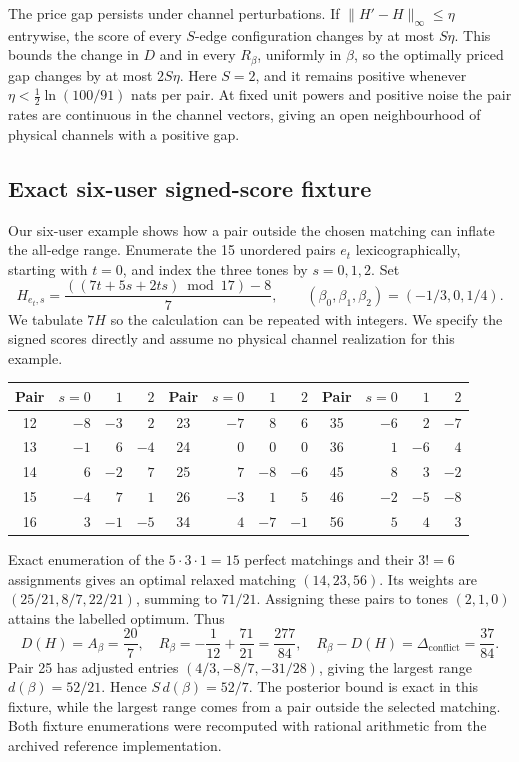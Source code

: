 \documentclass[10pt,letterpaper]{article}
\begin{document}
The price gap persists under channel perturbations. If \(\|H'-H\|_\infty\le\eta\) entrywise, the score of every \(S\)-edge configuration changes by at most \(S\eta\). This bounds the change in \(D\) and in every \(R_\beta\), uniformly in \(\beta\), so the optimally priced gap changes by at most \(2S\eta\). Here \(S=2\), and it remains positive whenever \(\eta<\tfrac12\ln(100/91)\) nats per pair. At fixed unit powers and positive noise the pair rates are continuous in the channel vectors, giving an open neighbourhood of physical channels with a positive gap.

\subsection{Exact six-user signed-score fixture}
Our six-user example shows how a pair outside the chosen matching can inflate the all-edge range. Enumerate the 15 unordered pairs $e_t$ lexicographically, starting with $t=0$, and index the three tones by $s=0,1,2$. Set
\begin{equation}
 H_{e_t,s}=\frac{((7t+5s+2ts)\bmod17)-8}{7},
 \qquad (\beta_0,\beta_1,\beta_2)=(-1/3,0,1/4).
 \label{supp:six-user-table}
\end{equation}
We tabulate $7H$ so the calculation can be repeated with integers. We specify the signed scores directly and assume no physical channel realization for this example.
\begin{center}
\setlength{\tabcolsep}{8pt}
\begin{tabular}{c|rrr@{\qquad}c|rrr@{\qquad}c|rrr}
Pair & $s=0$ & $1$ & $2$ & Pair & $s=0$ & $1$ & $2$ & Pair & $s=0$ & $1$ & $2$\\ \hline
12 & $-8$ & $-3$ & $2$ & 23 & $-7$ & $8$ & $6$ & 35 & $-6$ & $2$ & $-7$\\
13 & $-1$ & $6$ & $-4$ & 24 & $0$ & $0$ & $0$ & 36 & $1$ & $-6$ & $4$\\
14 & $6$ & $-2$ & $7$ & 25 & $7$ & $-8$ & $-6$ & 45 & $8$ & $3$ & $-2$\\
15 & $-4$ & $7$ & $1$ & 26 & $-3$ & $1$ & $5$ & 46 & $-2$ & $-5$ & $-8$\\
16 & $3$ & $-1$ & $-5$ & 34 & $4$ & $-7$ & $-1$ & 56 & $5$ & $4$ & $3$
\end{tabular}
\end{center}
Exact enumeration of the $5\cdot3\cdot1=15$ perfect matchings and their $3!=6$ assignments gives an optimal relaxed matching $(14,23,56)$. Its weights are $(25/21,8/7,22/21)$, summing to $71/21$. Assigning these pairs to tones $(2,1,0)$ attains the labelled optimum. Thus
\begin{equation}
 D(H)=A_\beta=\frac{20}{7},\quad
 R_\beta=-\frac1{12}+\frac{71}{21}=\frac{277}{84},\quad
 R_\beta-D(H)=\Delta_{\mathrm{conflict}}=\frac{37}{84}.
 \label{supp:six-user-values}
\end{equation}
Pair 25 has adjusted entries $(4/3,-8/7,-31/28)$, giving the largest range $d(\beta)=52/21$. Hence $S\,d(\beta)=52/7$. The posterior bound is exact in this fixture, while the largest range comes from a pair outside the selected matching. Both fixture enumerations were recomputed with rational arithmetic from the archived reference implementation.
\end{document}
